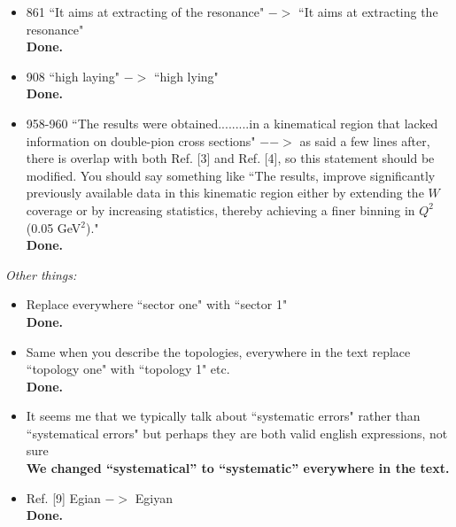 \documentclass[,superscriptaddress,showpacs,amssymb,amsmath,amsfonts,linenumbers,article]{revtex4-1}
\begin{document}
\begin{itemize}
\item 861 ``It aims at extracting of the resonance" $->$ ``It aims at extracting the resonance"\\[0.5cm]
{\bf Done.}

\item 908 ``high laying" $->$ ``high lying"\\[0.5cm]
{\bf Done.}

\item 958-960 ``The results were obtained.........in a kinematical region that lacked information on double-pion cross sections" $-->$ as said a few lines after, there is overlap with both Ref. [3] and Ref. [4], so this statement should be modified. You should say something like ``The results, improve significantly previously available data in this kinematic region either by extending the $W$ coverage or by increasing statistics, thereby achieving a finer binning in $Q^2$ (0.05 GeV$^2$)."\\
{\bf Done.}

\end{itemize}


\begin{center}
\large \it Other things: \\[0.5cm]
\end{center}

\begin{itemize}
\item  Replace everywhere ``sector one" with ``sector 1"\\
{\bf Done.}

\item  Same when you describe the topologies, everywhere in the text replace ``topology one" with ``topology 1" etc.\\
{\bf Done.}

\item  It seems me that we typically talk about ``systematic errors" rather than ``systematical errors" but perhaps they are both valid english expressions, not sure\\[0.5cm]
{\bf We changed ``systematical'' to ``systematic'' everywhere in the text.}

\item  Ref. [9] Egian $->$ Egiyan\\[0.5cm]
{\bf Done.}

\end{itemize}
\end{document}
